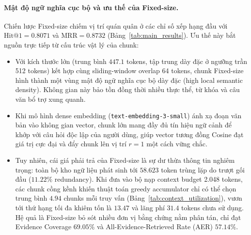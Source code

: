 \paragraph{Mật độ ngữ nghĩa cục bộ và ưu thế của Fixed-size.}
Chiến lược Fixed-size chiếm vị trí quán quân ở các chỉ số xếp hạng đầu với $\text{Hit@1} = 0.8071$ và $\text{MRR} = 0.8732$ (Bảng~\ref{tab:main_results}). Ưu thế này bắt nguồn trực tiếp từ cấu trúc vật lý của chunk:
\begin{itemize}
    \item Với kích thước lớn (trung bình $447.1$ tokens, tập trung dày đặc ở ngưỡng trần 512 tokens) kết hợp cùng sliding-window overlap 64 tokens, chunk Fixed-size hình thành một vùng mật độ ngữ nghĩa cục bộ dày đặc (high local semantic density). Không gian này bảo tồn đồng thời nhiều thực thể, từ khóa và câu văn bổ trợ xung quanh.
    \item Khi mô hình dense embedding (\texttt{text-embedding-3-small}) ánh xạ đoạn văn bản vào không gian vector, chunk lớn mang đầy đủ tín hiệu ngữ cảnh để khớp với câu hỏi độc lập của người dùng, giúp vector tương đồng Cosine đạt giá trị cực đại và đẩy chunk lên vị trí $r=1$ một cách vững chắc.
    \item Tuy nhiên, cái giá phải trả của Fixed-size là sự dư thừa thông tin nghiêm trọng: toàn bộ kho ngữ liệu phát sinh tới $58.623$ token trùng lặp do trượt gối đầu ($11.22\%$ redundancy). Khi đưa vào bộ nạp context budget 2.048 tokens, các chunk cồng kềnh khiến thuật toán greedy accumulator chỉ có thể chọn trung bình $4.94$ chunks mỗi truy vấn (Bảng~\ref{tab:context_utilization}), vươn tới thứ hạng tối đa khiêm tốn là $13.47$ và lãng phí $31.4$ tokens chưa sử dụng. Hệ quả là Fixed-size bỏ sót nhiều đơn vị bằng chứng nằm phân tán, chỉ đạt Evidence Coverage $69.05\%$ và All-Evidence-Retrieved Rate (AER) $57.14\%$.
\end{itemize}


